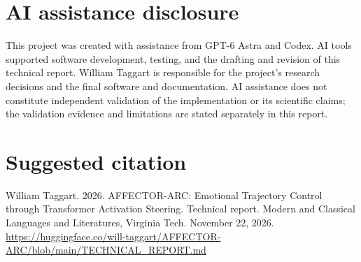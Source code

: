\documentclass[manuscript,screen,nonacm]{acmart}
\begin{document}
\section*{AI assistance disclosure}
This project was created with assistance from GPT-6 Astra and Codex. AI
tools supported software development, testing, and the drafting and
revision of this technical report. William Taggart is responsible for
the project's research decisions and the final software and
documentation. AI assistance does not constitute independent validation
of the implementation or its scientific claims; the validation evidence
and limitations are stated separately in this report.




\section*{Suggested citation}
William Taggart. 2026. AFFECTOR-ARC: Emotional Trajectory Control
through Transformer Activation Steering. Technical report. Modern and
Classical Languages and Literatures, Virginia Tech. November 22, 2026.
\url{https://huggingface.co/will-taggart/AFFECTOR-ARC/blob/main/TECHNICAL_REPORT.md}
\end{document}
